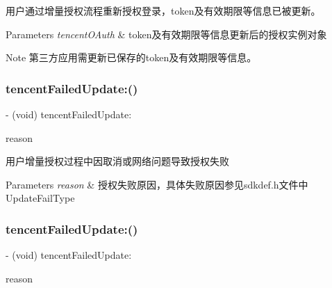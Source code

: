 用户通过增量授权流程重新授权登录，token及有效期限等信息已被更新。 
\begin{DoxyParams}{Parameters}
{\em tencent\+O\+Auth} & token及有效期限等信息更新后的授权实例对象 \\
\hline
\end{DoxyParams}
\begin{DoxyNote}{Note}
第三方应用需更新已保存的token及有效期限等信息。 
\end{DoxyNote}
\mbox{\label{protocol_tencent_session_delegate-p_aa62f3774c40da79bd17aff01b4745518}} 
\subsubsection{\texorpdfstring{tencent\+Failed\+Update\+:()}{tencentFailedUpdate:()}\hspace{0.1cm}{\footnotesize\ttfamily [1/2]}}
{\footnotesize\ttfamily -\/ (void) tencent\+Failed\+Update\+: \begin{DoxyParamCaption}\item[{(Update\+Fail\+Type)}]{reason }\end{DoxyParamCaption}\hspace{0.3cm}{\ttfamily [optional]}}

用户增量授权过程中因取消或网络问题导致授权失败 
\begin{DoxyParams}{Parameters}
{\em reason} & 授权失败原因，具体失败原因参见sdkdef.\+h文件中Update\+Fail\+Type \\
\hline
\end{DoxyParams}
\mbox{\label{protocol_tencent_session_delegate-p_aa62f3774c40da79bd17aff01b4745518}} 
\subsubsection{\texorpdfstring{tencent\+Failed\+Update\+:()}{tencentFailedUpdate:()}\hspace{0.1cm}{\footnotesize\ttfamily [2/2]}}
{\footnotesize\ttfamily -\/ (void) tencent\+Failed\+Update\+: \begin{DoxyParamCaption}\item[{(Update\+Fail\+Type)}]{reason }\end{DoxyParamCaption}\hspace{0.3cm}{\ttfamily [optional]}}

